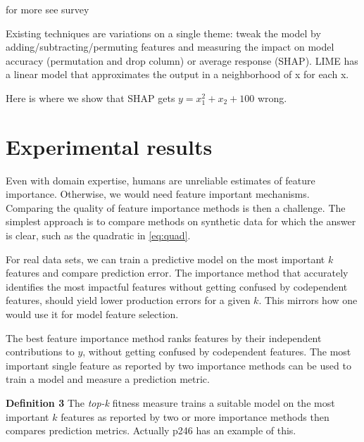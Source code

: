 \documentclass[12pt]{article}
\newcommand{\todo}[1]{{{\color{red}{[#1]}}}}
\begin{document}
 for more see survey \cite{survey}

Existing techniques are variations on a single theme: tweak the model by adding/subtracting/permuting features and measuring the impact on model accuracy (permutation and drop column) or average response (SHAP). LIME has a linear model that approximates the output in a neighborhood of x for each x.

Here is where we show that SHAP gets $y = x_1^2 + x_2 + 100$ wrong.

\section{Experimental results}\label{sec:experiments}

\todo{an experiment where we show and sensitive to noise column}

\todo{maybe show the linear 1 1 1 codependence example}

\todo{what about outlier example}

\todo{stability is valuable. users would not trust results that changed significantly for small data set changes. show our error bars from bootstrapping and say we can do p-values.}

\todo{bulldozer: YearMade ignores too much with stratpd, use catstrat}

Even with domain expertise, humans are unreliable estimates of feature importance. Otherwise, we would need feature important mechanisms. Comparing the quality of feature importance methods is then a challenge. The simplest approach is to compare methods on synthetic data for which the answer is clear, such as the quadratic in \ref{eq:quad}.

For real data sets, we can train a predictive model on the most important $k$ features and compare prediction error. The importance method that accurately identifies the most impactful features without getting confused by codependent features, should yield lower production errors for a given $k$.   This mirrors how one would use it for model feature selection.
 
The best feature importance method ranks features by their independent contributions to $y$, without getting confused by codependent features. The most important single feature as reported by two importance methods can be used to train a model and measure a prediction metric.
 
{\bf Definition 3} The {\em top-k} fitness measure trains a suitable model on the  most important $k$ features as reported by two or more importance methods then compares prediction metrics. Actually p246 \cite{liu-fs} has an example of this.
\end{document}
